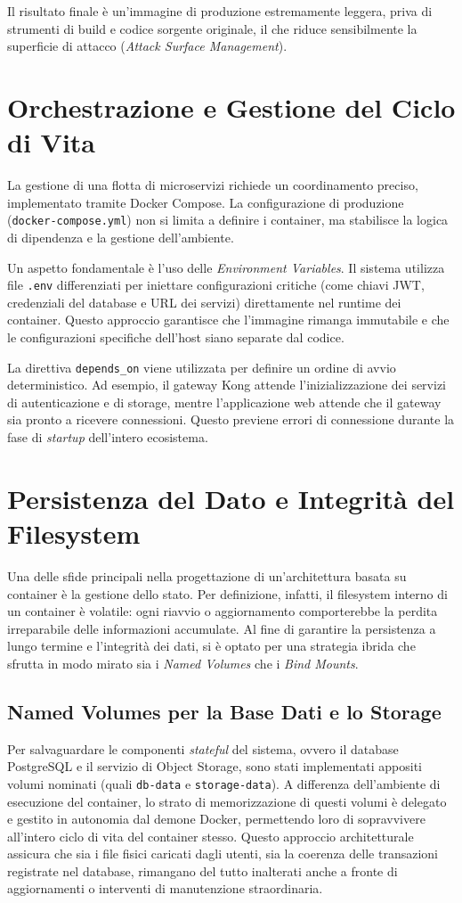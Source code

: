 \documentclass[12pt,a4paper]{report}
\begin{document}
Il risultato finale è un'immagine di produzione estremamente leggera,
priva di strumenti di build e codice sorgente originale, il che
riduce sensibilmente la superficie di attacco (\textit{Attack Surface
Management}).

\section{Orchestrazione e Gestione del Ciclo di Vita}
La gestione di una flotta di microservizi richiede un coordinamento
preciso, implementato tramite Docker Compose. La configurazione di
produzione (\texttt{docker-compose.yml}) non si limita a definire i
container, ma stabilisce la logica di dipendenza e la gestione dell'ambiente.

Un aspetto fondamentale è l'uso delle \textit{Environment Variables}.
Il sistema utilizza file \texttt{.env} differenziati per iniettare
configurazioni critiche (come chiavi JWT, credenziali del database e
URL dei servizi) direttamente nel runtime dei container. Questo
approccio garantisce che l'immagine rimanga immutabile e che le
configurazioni specifiche dell'host siano separate dal codice.

La direttiva \texttt{depends\_on} viene utilizzata per definire un
ordine di avvio deterministico. Ad esempio, il gateway Kong attende
l'inizializzazione dei servizi di autenticazione e di storage, mentre
l'applicazione web attende che il gateway sia pronto a ricevere
connessioni. Questo previene errori di connessione durante la fase di
\textit{startup} dell'intero ecosistema.

\section{Persistenza del Dato e Integrità del Filesystem}
Una delle sfide principali nella progettazione di un'architettura
basata su container è la gestione dello stato. Per definizione,
infatti, il filesystem interno di un container è volatile: ogni
riavvio o aggiornamento comporterebbe la perdita irreparabile delle
informazioni accumulate. Al fine di garantire la persistenza a lungo
termine e l'integrità dei dati, si è optato per una strategia ibrida
che sfrutta in modo mirato sia i \textit{Named Volumes} che i
\textit{Bind Mounts}.

\subsection{Named Volumes per la Base Dati e lo Storage}
Per salvaguardare le componenti \textit{stateful} del sistema, ovvero
il database PostgreSQL e il servizio di Object Storage, sono stati
implementati appositi volumi nominati (quali \texttt{db-data} e
\texttt{storage-data}). A differenza dell'ambiente di esecuzione del
container, lo strato di memorizzazione di questi volumi è delegato e
gestito in autonomia dal demone Docker, permettendo loro di
sopravvivere all'intero ciclo di vita del container stesso. Questo
approccio architetturale assicura che sia i file fisici caricati
dagli utenti, sia la coerenza delle transazioni registrate nel
database, rimangano del tutto inalterati anche a fronte di
aggiornamenti o interventi di manutenzione straordinaria.
\end{document}
